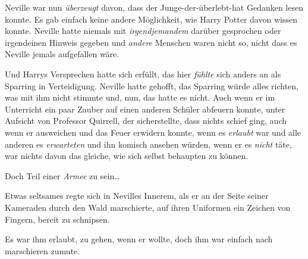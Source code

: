 Neville war nun \emph{überzeugt} davon, dass der Junge-der-überlebt-hat Gedanken lesen konnte. Es gab einfach keine andere Möglichkeit, wie Harry Potter davon wissen konnte. Neville hatte niemals mit \emph{irgendjemandem} darüber gesprochen oder irgendeinen Hinweis gegeben und \emph{andere} Menschen waren nicht so, nicht dass es Neville jemals aufgefallen wäre.

Und Harrys Versprechen hatte sich erfüllt, das hier \emph{fühlte} sich anders an als Sparring in Verteidigung. Neville hatte gehofft, das Sparring würde alles richten, was mit ihm nicht stimmte und, nun, das hatte es nicht. Auch wenn er im Unterricht ein paar Zauber auf einen anderen Schüler abfeuern konnte, unter Aufsicht von Professor Quirrell, der sicherstellte, dass nichts schief ging, auch wenn er ausweichen und das Feuer erwidern konnte, wenn es \emph{erlaubt} war und alle anderen es \emph{erwarteten} und ihn komisch ansehen würden, wenn er es \emph{nicht} täte, war nichts davon das gleiche, wie sich selbst behaupten zu können.

Doch Teil einer \emph{Armee} zu sein…

Etwas seltsames regte sich in Nevilles Innerem, als er an der Seite seiner Kameraden durch den Wald marschierte, auf ihren Uniformen ein Zeichen von Fingern, bereit zu schnipsen.

Es war ihm erlaubt, zu gehen, wenn er wollte, doch ihm war einfach nach marschieren zumute.

